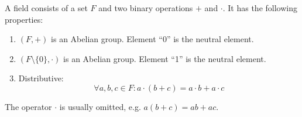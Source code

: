 \begin{definition}[Field]
    A field consists of a set $F$ and two binary operations $+$ and $\cdot$.
    It has the following properties:
    \begin{enumerate}
        \item $(F,+)$ is an Abelian group. Element ``0'' is the neutral element.
        \item $(F\setminus\{0\},\cdot)$ is an Abelian group. Element ``1'' is the neutral element.
        \item Distributive:
            \begin{equation}
                \forall a,b,c \in F: a \cdot (b + c) = a \cdot b + a \cdot c
            \end{equation}
    \end{enumerate}
    The operator $\cdot$ is usually omitted, e.g. $a (b + c) = ab + ac$.
\end{definition}

